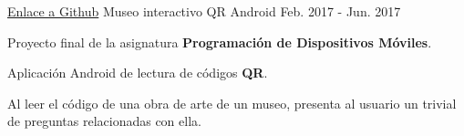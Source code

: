 \begin{cventries}
  \cventry
    {\href{https://github.com/matl1995/PDM/tree/master/Museo}{Enlace a Github}} %
    {Museo interactivo QR} %
    {Android} %
    {Feb. 2017 - Jun. 2017} %
    {
      \begin{cvitems} %
        \item {Proyecto final de la asignatura \textbf{Programación de Dispositivos Móviles}.}
        \item {Aplicación Android de lectura de códigos \textbf{QR}.}
        \item {Al leer el código de una obra de arte de un museo, presenta al usuario un trivial de preguntas relacionadas con ella.}
      \end{cvitems}
    }

\end{cventries}
